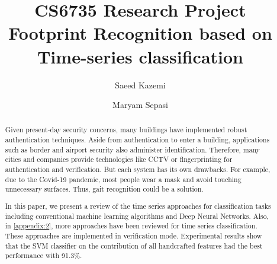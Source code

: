 \begin{frontmatter}
\title{\Huge CS6735 Research Project \\Footprint Recognition based on \\ Time-series classification }

\author{Saeed Kazemi}
\author{Maryam Sepasi}
\address{University of New Brunswick}


\begin{abstract}
Given present-day security concerns, many buildings have implemented robust authentication techniques. Aside from authentication to enter a building, applications such as border and airport security also administer identification. Therefore, many cities and companies provide technologies like CCTV or fingerprinting for authentication and verification. But each system has its own drawbacks. For example, due to the Covid-19 pandemic, most people wear a mask and avoid touching unnecessary surfaces. Thus, gait recognition could be a solution. 






In this paper, we present a review of the time series approaches for classification tasks including conventional machine learning algorithms and Deep Neural Networks. Also, in \ref{appendix:2}, more approaches have been reviewed for time series classification. These approaches are implemented in verification mode. Experimental results show that the SVM classifier on the contribution of all handcrafted features had the best performance with 91.3\%.



\end{abstract}
\end{frontmatter}
